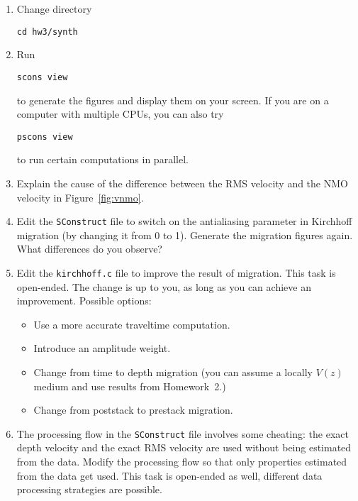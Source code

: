 \begin{enumerate}
\begin{enumerate}
\item Change directory 
\begin{verbatim}
cd hw3/synth
\end{verbatim}
\item Run
\begin{verbatim}
scons view
\end{verbatim}
to generate the figures and display them on your screen.
If you are on a computer with multiple CPUs, you
can also try
\begin{verbatim}
pscons view
\end{verbatim}
to run certain computations in parallel.
\item Explain the cause of the difference between the RMS velocity and the NMO velocity in Figure~\ref{fig:vnmo}.
\item Edit the \texttt{SConstruct} file to switch on the antialiasing parameter in Kirchhoff migration 
(by changing it from 0 to 1). Generate the migration figures again. What differences do you observe?
\item Edit the \texttt{kirchhoff.c} file to improve the result of migration. This task is open-ended. 
The change is up to you, as long as you can achieve an improvement. Possible options:
\begin{itemize}
\item Use a more accurate traveltime computation.
\item Introduce an amplitude weight.
\item Change from time to depth migration (you can assume a locally $V(z)$ medium and use results from Homework~2.)
\item Change from poststack to prestack migration.
\end{itemize}
\item The processing flow in the \texttt{SConstruct} file involves some cheating: the exact 
depth velocity and the exact RMS velocity are used without being
estimated from the data. Modify the processing flow so that only
properties estimated from the data get used. This task is open-ended
as well, different data processing strategies are possible.
\end{enumerate}

\lstset{language=python,numbers=left,numberstyle=\tiny,showstringspaces=false}


\lstset{language=c,numbers=left,numberstyle=\tiny,showstringspaces=false}



\end{enumerate}
